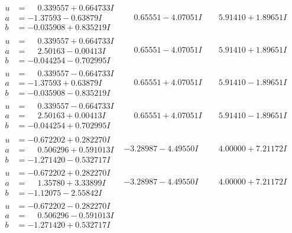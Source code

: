 \documentclass[1p]{elsarticle_modified}
\theoremstyle{definition}
\begin{document}
$$\begin{array}{c|c|c}
\begin{aligned}
u &= \phantom{-}0.339557 + 0.664733 I \\
a &= -1.37593 - 0.63879 I \\
b &= -0.035908 + 0.835219 I\end{aligned}
 & \phantom{-}0.65551 - 4.07051 I & \phantom{-}5.91410 + 1.89651 I \\ \hline\begin{aligned}
u &= \phantom{-}0.339557 + 0.664733 I \\
a &= \phantom{-}2.50163 - 0.00413 I \\
b &= -0.044254 - 0.702995 I\end{aligned}
 & \phantom{-}0.65551 - 4.07051 I & \phantom{-}5.91410 + 1.89651 I \\ \hline\begin{aligned}
u &= \phantom{-}0.339557 - 0.664733 I \\
a &= -1.37593 + 0.63879 I \\
b &= -0.035908 - 0.835219 I\end{aligned}
 & \phantom{-}0.65551 + 4.07051 I & \phantom{-}5.91410 - 1.89651 I \\ \hline\begin{aligned}
u &= \phantom{-}0.339557 - 0.664733 I \\
a &= \phantom{-}2.50163 + 0.00413 I \\
b &= -0.044254 + 0.702995 I\end{aligned}
 & \phantom{-}0.65551 + 4.07051 I & \phantom{-}5.91410 - 1.89651 I \\ \hline\begin{aligned}
u &= -0.672202 + 0.282270 I \\
a &= \phantom{-}0.506296 + 0.591013 I \\
b &= -1.271420 - 0.532717 I\end{aligned}
 & -3.28987 - 4.49550 I & \phantom{-}4.00000 + 7.21172 I \\ \hline\begin{aligned}
u &= -0.672202 + 0.282270 I \\
a &= \phantom{-}1.35780 + 3.33899 I \\
b &= -1.12075 - 2.55842 I\end{aligned}
 & -3.28987 - 4.49550 I & \phantom{-}4.00000 + 7.21172 I \\ \hline\begin{aligned}
u &= -0.672202 - 0.282270 I \\
a &= \phantom{-}0.506296 - 0.591013 I \\
b &= -1.271420 + 0.532717 I\end{aligned}

\end{array}$$
\end{document}
